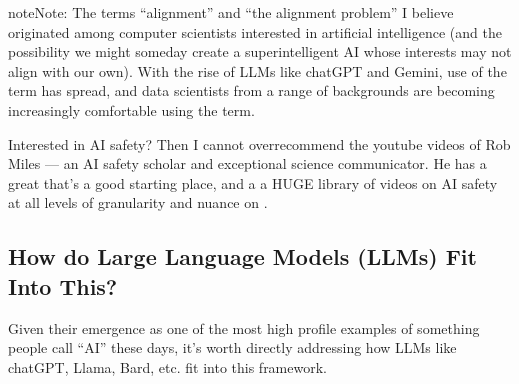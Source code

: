 \documentclass[letterpaper,10pt,english]{jupyterBook}
\begin{document}
\begin{sphinxadmonition}{note}{Note:}
\sphinxAtStartPar
The terms “alignment” and “the alignment problem” I believe originated among computer scientists interested in artificial intelligence (and the possibility we might someday create a super\sphinxhyphen{}intelligent AI whose interests may not align with our own). With the rise of LLMs like chatGPT and Gemini, use of the term has spread, and data scientists from a range of backgrounds are becoming increasingly comfortable using the term.

\sphinxAtStartPar
Interested in AI safety? Then I cannot over\sphinxhyphen{}recommend the youtube videos of Rob Miles — an AI safety scholar and exceptional science communicator. He has a great  that’s a good starting place, and a a HUGE library of videos on AI safety at all levels of granularity and nuance on .
\end{sphinxadmonition}


\subsection{How do Large Language Models (LLMs) Fit Into This?}
\label{\detokenize{30_questions/23_passive_internal_alignment_and_bias:how-do-large-language-models-llms-fit-into-this}}
\sphinxAtStartPar
Given their emergence as one of the most high profile examples of something people call “AI” these days, it’s worth directly addressing how LLMs like chatGPT, Llama, Bard, etc. fit into this framework.
\end{document}
